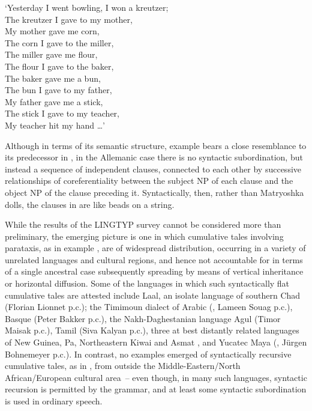 \documentclass[output=paper,colorlinks,citecolor=brown
]{langscibook}
\begin{document}
`Yesterday I went bowling, I won a kreutzer;\\
The kreutzer I gave to my mother, \\
My mother gave me corn, \\
The corn I gave to the miller, \\
The miller gave me flour, \\
The flour I gave to the baker, \\
The baker gave me a bun, \\
The bun I gave to my father, \\
My father gave me a stick, \\
The stick I gave to my teacher, \\
My teacher hit my hand  \ldots' \\

\z

Although in terms of its semantic structure, example  bears a close resemblance to its predecessor in , in the Allemanic case there is no syntactic subordination, but instead a sequence of independent clauses, connected to each other by successive relationships of coreferentiality between the subject NP of each clause and the object NP of the clause preceding it.  Syntactically, then, rather than Matryoshka dolls, the clauses in  are like beads on a string.

While the results of the LINGTYP survey cannot be considered more than preliminary, the emerging picture is one in which cumulative tales involving parataxis, as in example , are of widespread distribution, occurring in a variety of unrelated languages and cultural regions, and hence not accountable for in terms of a single ancestral case subsequently spreading by means of vertical inheritance or horizontal diffusion.  Some of the languages in which such syntactically flat cumulative tales are attested include Laal, an isolate language of southern Chad (Florian Lionnet p.c.); the Timimoun dialect of Arabic (\cite{mammeri1985ahellil}, Lameen Souag p.c.), Basque (Peter Bakker p.c.), the Nakh-Daghestanian language Agul (Timor Maisak p.c.), Tamil (Siva Kalyan p.c.), three at best distantly related languages of New Guinea, Pa, Northeastern Kiwai and Asmat \citep{voorhoeve2010remarkable}, and Yucatec Maya (\cite[180--186]{smailus1975textos}, Jürgen Bohnemeyer p.c.).  In contrast, no examples emerged of syntactically recursive cumulative tales, as in , from outside the Middle-Eastern\slash North African\slash European cultural area~– even though, in many such languages, syntactic recursion is permitted by the grammar, and at least some syntactic subordination is used in ordinary speech.  
\end{document}
